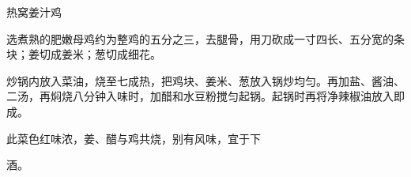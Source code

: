 \begin{recipe}{热窝姜汁鸡}

\ingredients


\cooking

\step 选煮熟的肥嫩母鸡约为整鸡的五分之三，去腿骨，用刀砍成一寸四长、五分宽的条块；姜切成姜米；葱切成细花。

\step 炒锅内放入菜油，烧至七成热，把鸡块、姜米、葱放入锅炒均匀。再加盐、酱油、二汤，再焖烧八分钟入味时，加醋和水豆粉搅匀起锅。起锅时再将净辣椒油放入即成。

\notes

此菜色红味浓，姜、醋与鸡共烧，别有风味，宜于下

酒。

\end{recipe}

